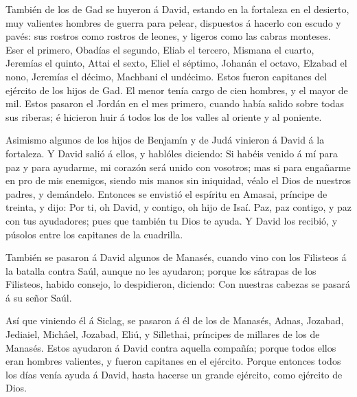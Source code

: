  También de los de Gad se huyeron á David, estando en la
fortaleza en el desierto, muy valientes hombres de guerra para pelear,
dispuestos á hacerlo con escudo y pavés: sus rostros como rostros de
leones, y ligeros como las cabras monteses.  Eser el
primero, Obadías el segundo, Eliab el tercero,  Mismana el
cuarto, Jeremías el quinto,  Attai el sexto, Eliel el
séptimo,  Johanán el octavo, Elzabad el nono, 
Jeremías el décimo, Machbani el undécimo.  Estos fueron
capitanes del ejército de los hijos de Gad. El menor tenía cargo de cien
hombres, y el mayor de mil.  Estos pasaron el Jordán en el
mes primero, cuando había salido sobre todas sus riberas; é hicieron
huir á todos los de los valles al oriente y al poniente.

 Asimismo algunos de los hijos de Benjamín y de Judá
vinieron á David á la fortaleza.  Y David salió á ellos, y
hablóles diciendo: Si habéis venido á mí para paz y para ayudarme, mi
corazón será unido con vosotros; mas si para engañarme en pro de mis
enemigos, siendo mis manos sin iniquidad, véalo el Dios de nuestros
padres, y demándelo.  Entonces se envistió el espíritu en
Amasai, príncipe de treinta, y dijo: Por ti, oh David, y contigo, oh
hijo de Isaí. Paz, paz contigo, y paz con tus ayudadores; pues que
también tu Dios te ayuda. Y David los recibió, y púsolos entre los
capitanes de la cuadrilla.

 También se pasaron á David algunos de Manasés, cuando vino
con los Filisteos á la batalla contra Saúl, aunque no les ayudaron;
porque los sátrapas de los Filisteos, habido consejo, lo despidieron,
diciendo: Con nuestras cabezas se pasará á su señor Saúl.

 Así que viniendo él á Siclag, se pasaron á él de los de
Manasés, Adnas, Jozabad, Jediaiel, Michâel, Jozabad, Eliú, y Sillethai,
príncipes de millares de los de Manasés.  Estos ayudaron á
David contra aquella compañía; porque todos ellos eran hombres
valientes, y fueron capitanes en el ejército.  Porque
entonces todos los días venía ayuda á David, hasta hacerse un grande
ejército, como ejército de Dios.

